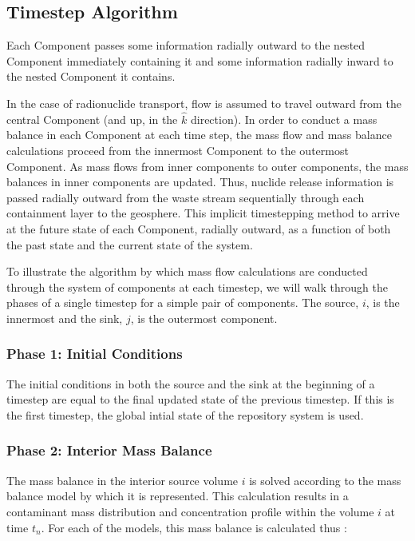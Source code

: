\subsection{Timestep Algorithm}\label{sec:timestepping}

Each Component passes some information radially outward to the nested 
Component immediately containing it and some information radially 
inward to the nested Component it contains. 

In the case of radionuclide transport, flow is assumed to travel outward from 
the central Component (and up, in the $\hat{k}$ direction). In order to conduct 
a mass balance in each Component at each time step, the mass flow and mass 
balance calculations proceed from the innermost Component to the outermost 
Component. As mass flows from inner components to outer components, the mass 
balances in inner components are updated.  Thus, nuclide release information is 
passed radially outward from the waste stream sequentially through each 
containment layer to the geosphere.  This implicit timestepping method to 
arrive at the future state of each Component, radially outward, as a function 
of both the past state and the current state of the system. 


To illustrate the algorithm by which mass flow calculations are conducted 
through the system of components at each timestep, we will walk through the 
phases of a single timestep for a simple pair of components. The source, $i$, 
is the innermost and the sink, $j$, is the outermost component. 

\subsubsection{Phase 1: Initial Conditions}

The initial conditions in both the source and the sink at the beginning of a 
timestep are equal to the final updated state of the previous timestep. If this 
is the first timestep, the global intial state of the repository system is used. 

\subsubsection{Phase 2: Interior Mass Balance}

The mass balance in the interior source volume $i$ is solved according to the mass 
balance model by which it is represented. This calculation results in a 
contaminant mass distribution and concentration profile within the volume $i$ 
at time $t_n$. 
For each of the models, this mass balance is calculated thus :


